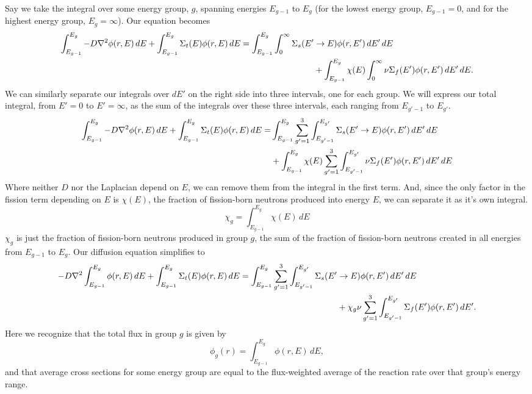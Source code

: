 \documentclass{report}
\begin{document}
\begin{enumerate}[a)]
Say we take the integral over some energy group, $g$, spanning energies $E_{g-1}$ to $E_g$ (for the lowest energy group, $E_{g-1} = 0$, and for the highest energy group, $E_g = \infty$). Our equation becomes
\begin{align*}
\int_{E_{g-1}}^{E_g} -D \nabla^2 \phi(r,E)\,dE + \int_{E_{g-1}}^{E_g} \Sigma_t(E) \phi(r,E)\,dE = \int_{E_{g-1}}^{E_g} \int_0^{\infty} \Sigma_s(E' &\rightarrow E)\phi(r,E')\,dE'\,dE \\
&+ \int_{E_{g-1}}^{E_g} \chi(E) \int_0^{\infty} \nu \Sigma_f(E')\phi(r,E')\,dE'\,dE .
\end{align*}
We can similarly separate our integrals over $dE'$ on the right side into three intervals, one for each group. We will express our total integral, from $E' = 0$ to $E'=\infty$, as the sum of the integrals over these three intervals, each ranging from $E_{g'-1}$ to $E_{g'}$.
\begin{align*}
\int_{E_{g-1}}^{E_g} -D \nabla^2 \phi(r,E)\,dE + \int_{E_{g-1}}^{E_g} \Sigma_t(E) \phi(r,E)\,dE = &\int_{E_{g-1}}^{E_g} \sum_{g'=1}^3 \int_{E_{g'-1}}^{E_{g'}} \Sigma_s(E' \rightarrow E)\phi(r,E')\,dE'\,dE \\
 &+ \int_{E_{g-1}}^{E_g} \chi(E) \sum_{g'=1}^3 \int_{E_{g'-1}}^{E_{g'}} \nu \Sigma_f(E')\phi(r,E')\,dE'\,dE 
\end{align*}
Where neither $D$ nor the Laplacian depend on $E$, we can remove them from the integral in the first term. And, since the only factor in the fission term depending on $E$ is $\chi(E)$, the fraction of fission-born neutrons produced into energy $E$, we can separate it as it's own integral. 
$$ \chi_g = \int_{E_{g-1}}^{E_g} \chi(E)\,dE $$
$\chi_g$ is just the fraction of fission-born neutrons produced in group $g$, the sum of the fraction of fission-born neutrons created in all energies from $E_{g-1}$ to $E_g$. Our diffusion equation simplifies to
\begin{align*}
-D \nabla^2 \int_{E_{g-1}}^{E_g} \phi(r,E)\,dE + \int_{E_{g-1}}^{E_g} \Sigma_t(E) \phi(r,E)\,dE = \int_{E_{g-1}}^{E_g} \sum_{g'=1}^3 \int_{E_{g'-1}}^{E_{g'}} \Sigma_s(E' &\rightarrow E)\phi(r,E')\,dE'\,dE \\
 &+ \chi_g \nu \sum_{g'=1}^3 \int_{E_{g'-1}}^{E_{g'}} \Sigma_f(E')\phi(r,E')\,dE' .
\end{align*}
Here we recognize that the total flux in group $g$ is given by
$$ \phi_g(r) = \int_{E_{g-1}}^{E_g} \phi(r,E)\,dE ,$$
and that average cross sections for some energy group are equal to the flux-weighted average of the reaction rate over that group's energy range.

\end{enumerate}
\end{document}
